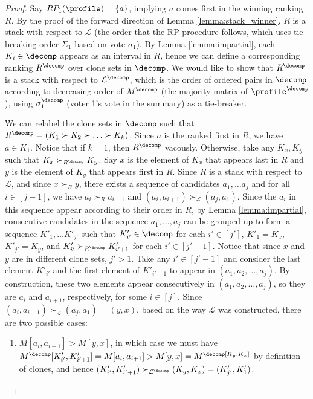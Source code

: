 \begin{proof}
Say $RP_1(\profile)=\{a\}$, implying $a$ comes first in the winning ranking $R$. By the proof of the forward direction of Lemma \ref{lemma:stack_winner}, $R$ is a stack with respect to $\mathcal{L}$ (the order that the RP procedure follows, which uses tie-breaking order $\Sigma_1$ based on vote $\sigma_1$). By Lemma \ref{lemma:impartial}, each $K_i \in \decomp$ appears as an interval in $R$, hence we can define a corresponding ranking $R^{\decomp}$ over clone sets in $\decomp$. We would like to show that $R^\decomp$ is a stack with respect to $\mathcal{L}^\decomp$, which is the order of ordered pairs in $\decomp$ according to decreasing order of $M^\decomp$ (the majority matrix of $\profile^\decomp$), using $\sigma_1^\decomp$ (voter 1's vote in the summary) as a tie-breaker. 

We can relabel the clone sets in $\decomp$ such that $R^\decomp=(K_1\succ K_2 \succ \ldots \succ K_k)$. Since $a$ is the ranked first in $R$, we have $a \in K_1$. Notice that if $k=1$, then $R^\decomp$ vacously. Otherwise, take any $K_x, K_y$ such that $K_x \succ_{R^\decomp} K_y$. Say $x$ is the element of $K_x$ that appears last in $R$ and $y$ is the element of $K_y$ that appears first in $R$. Since $R$ is a stack with respect to $\mathcal{L}$, and since $x \succ_R y$, there exists a sequence of candidates $a_1,\ldots a_j$ and for all $i \in [j-1]$, we have $a_i \succ_R a_{i+1}$ and $(a_i,a_{i+1}) \succ_{\mathcal{L}} (a_j , a_1)$. Since the $a_i$ in this sequence appear according to their order in $R$, by Lemma \ref{lemma:impartial}, consecutive candidates in the sequence $a_1,\ldots,a_j$ can be grouped up to form a sequence $K'_1, \ldots K'_{j'}$ such that $K'_{i'} \in \decomp$ for each $i'\in [j']$, $K'_1 = K_x$, $K'_{j'}=K_y$, and $K'_{i'} \succ_{R^\decomp}K'_{i'+1}$ for each $i'\in [j'-1]$. Notice that since $x$ and $y$ are in different clone sets, $j'>1$. Take any $i' \in [j'-1]$ and consider the last element $K'_{i'}$ and the first element of $K'_{i'+1}$ to appear in $(a_1,a_2,\ldots, a_j)$. By construction, these two elements appear consecutively in $(a_1,a_2,\ldots, a_j)$, so they are $a_i$ and $a_{i+1}$, respectively, for some $i \in [j]$. Since $(a_i,a_{i+1})\succ_\mathcal{L}(a_j,a_1)=(y,x)$, based on the way $\mathcal{L}$ was constructed, there are two possible cases:
\begin{enumerate}
    \item $M[a_i,a_{i+1}] > M[y,x]$, in which case we must have $M^\decomp[K'_{i'}, K'_{i'+1}]= M[a_i,a_{i+1}] > M[y,x]= M^\decomp[K_y,K_x]$ by definition of clones, and hence $(K'_{i'},K'_{i'+1})\succ_{\mathcal{L}^\decomp}(K_y,K_x) = (K'_{j'}, K'_{1})$.

\end{enumerate}
\end{proof}
